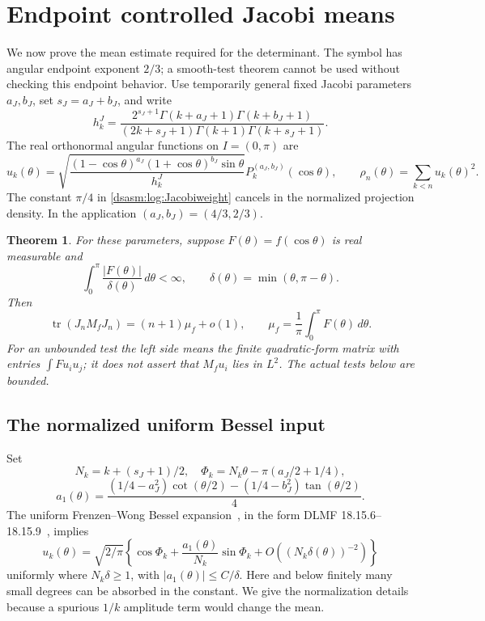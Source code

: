 \documentclass[11pt,letterpaper]{article}
\newtheorem{theorem}{Theorem}[section]
\theoremstyle{remark}\newtheorem{remark}[theorem]{Remark}
\DeclareMathOperator{\tr}{tr}\DeclareMathOperator{\Ran}{Ran}
\begin{document}
\section{Endpoint controlled Jacobi means}
\label{dsasm:log:sec:mean}
We now prove the mean estimate required for the determinant. The
symbol has angular endpoint exponent $2/3$; a smooth-test theorem
cannot be used without checking this endpoint behavior.
Use temporarily general fixed Jacobi parameters $a_J,b_J$, set
$s_J=a_J+b_J$, and write
\begin{equation}\label{dsasm:log:Jacobinorm}
 h_k^{J}=\frac{2^{s_J+1}\Gamma(k+a_J+1)\Gamma(k+b_J+1)}
 {(2k+s_J+1)\Gamma(k+1)\Gamma(k+s_J+1)}.
\end{equation}
The real orthonormal angular functions on $I=(0,\pi)$ are
\begin{equation}\label{dsasm:log:angularfunctions}
 u_k(\theta)=\sqrt{\frac{(1-\cos\theta)^{a_J}(1+\cos\theta)^{b_J}
                                  \sin\theta}{h_k^{J}}}
                  P_k^{(a_J,b_J)}(\cos\theta),\qquad
 \rho_n(\theta)=\sum_{k<n}u_k(\theta)^2.
\end{equation}
The constant $\pi/4$ in \eqref{dsasm:log:Jacobiweight} cancels in the normalized
projection density. In the application $(a_J,b_J)=(4/3,2/3)$.

\begin{theorem}\label{dsasm:log:meantheorem}
For these parameters, suppose $F(\theta)=f(\cos\theta)$ is real
measurable and
\begin{equation}\label{dsasm:log:meancondition}
 \int_0^\pi\frac{|F(\theta)|}{\delta(\theta)}\,d\theta<\infty,
 \qquad \delta(\theta)=\min(\theta,\pi-\theta).
\end{equation}
Then
\begin{equation}\label{dsasm:log:meanformula}
 \tr(J_nM_fJ_n)=(n+1)\mu_f+o(1),\qquad
 \mu_f=\frac1\pi\int_0^\pi F(\theta)\,d\theta.
\end{equation}
For an unbounded test the left side means the finite quadratic-form
matrix with entries $\int F u_i u_j$; it does not assert that
$M_fu_i$ lies in $L^2$. The actual tests below are bounded.
\end{theorem}

\subsection{The normalized uniform Bessel input}
Set
\[
 N_k=k+(s_J+1)/2,\quad
 \Phi_k=N_k\theta-\pi(a_J/2+1/4),
\]
\[
 a_1(\theta)=\frac{(1/4-a_J^2)\cot(\theta/2)
                         -(1/4-b_J^2)\tan(\theta/2)}4.
\]
The uniform Frenzen--Wong Bessel expansion~\cite{fw}, in the form
DLMF 18.15.6--18.15.9~\cite{dlmf}, implies
\begin{equation}\label{dsasm:log:angularasymp}
 u_k(\theta)=\sqrt{2/\pi}
 \left\{\cos\Phi_k+\frac{a_1(\theta)}{N_k}\sin\Phi_k
                     +O((N_k\delta(\theta))^{-2})\right\}
\end{equation}
uniformly where $N_k\delta\ge1$, with $|a_1(\theta)|\le C/\delta$.
Here and below finitely many small degrees can be absorbed in the
constant. We give the normalization details because a spurious
$1/k$ amplitude term would change the mean.
\end{document}
